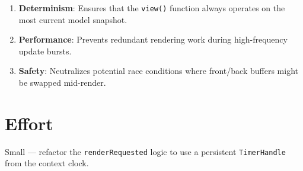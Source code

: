 \begin{enumerate}
\def\labelenumi{\arabic{enumi}.}
\tightlist
\item
  \textbf{Determinism}: Ensures that the \texttt{v\allowbreak{}i\allowbreak{}e\allowbreak{}w\allowbreak{}(\allowbreak{})} function always operates on the most current model snapshot.
\item
  \textbf{Performance}: Prevents redundant rendering work during high-frequency update bursts.
\item
  \textbf{Safety}: Neutralizes potential race conditions where front/back buffers might be swapped mid-render.
\end{enumerate}

\section{Effort}\label{record-378-effort}

Small --- refactor the \texttt{r\allowbreak{}e\allowbreak{}n\allowbreak{}d\allowbreak{}e\allowbreak{}r\allowbreak{}R\allowbreak{}e\allowbreak{}q\allowbreak{}u\allowbreak{}e\allowbreak{}s\allowbreak{}t\allowbreak{}e\allowbreak{}d} logic to use a persistent \texttt{T\allowbreak{}i\allowbreak{}m\allowbreak{}e\allowbreak{}r\allowbreak{}H\allowbreak{}a\allowbreak{}n\allowbreak{}d\allowbreak{}l\allowbreak{}e} from the context clock.

